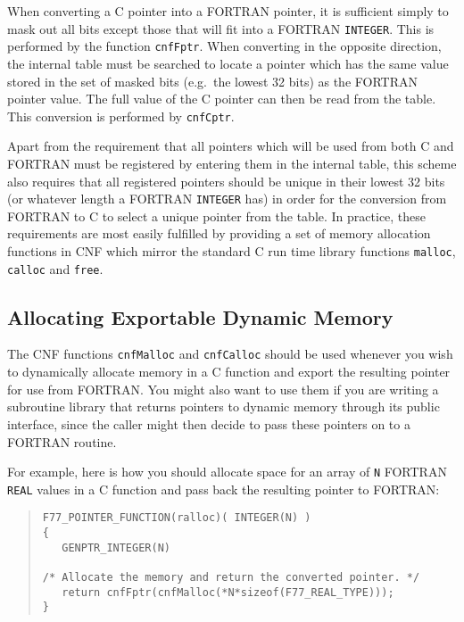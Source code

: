 \documentclass[twoside,11pt]{article}
\newcommand{\htmlref}[2]{#1}
\newcommand{\xlabel}[1]{}
\renewcommand{\_}{\texttt{\symbol{95}}}
\begin{document}
When converting a C pointer into a FORTRAN pointer, it is sufficient
simply to mask out all bits except those that will fit into a FORTRAN
\texttt{INTEGER}. This is performed by the function
\htmlref{\texttt{cnfFptr}}{cnfFptr}.  
When converting in the opposite direction, the
internal table must be searched to locate a pointer which has the same
value stored in the set of masked bits (e.g.\ the lowest 32 bits) as
the FORTRAN pointer value. The full value of the C pointer can then be
read from the table. This conversion is performed by
\htmlref{\texttt{cnfCptr}}{cnfCptr}.

Apart from the requirement that all pointers which will be used from
both C and FORTRAN must be registered by entering them in the internal
table, this scheme also requires that all registered pointers should
be unique in their lowest 32 bits (or whatever length a FORTRAN
\texttt{INTEGER} has) in order for the conversion from FORTRAN to C to
select a unique pointer from the table. In practice, these
requirements are most easily fulfilled by providing a set of memory
allocation functions in CNF which mirror the standard C run time
library functions \texttt{malloc}, \texttt{calloc} and \texttt{free}.

\subsection{\xlabel{allocating_exportable_dynamic_memory}Allocating
Exportable Dynamic Memory}

The CNF functions 
\htmlref{\texttt{cnfMalloc}}{cnfMalloc}
and
\htmlref{\texttt{cnfCalloc}}{cnfCalloc}
should be used whenever you wish to dynamically allocate memory in a C
function and export the resulting pointer for use from FORTRAN. You
might also want to use them if you are writing a subroutine library
that returns pointers to dynamic memory through its public interface,
since the caller might then decide to pass these pointers on to a
FORTRAN routine.

For example, here is how you should allocate space for an array of
\texttt{N} FORTRAN \texttt{REAL} values in a C function and pass back
the resulting pointer to FORTRAN:

{\small \begin{quote} \begin{verbatim}
F77_POINTER_FUNCTION(ralloc)( INTEGER(N) )
{
   GENPTR_INTEGER(N)

/* Allocate the memory and return the converted pointer. */
   return cnfFptr(cnfMalloc(*N*sizeof(F77_REAL_TYPE)));
}
\end{verbatim} \end{quote} }
\end{document}
